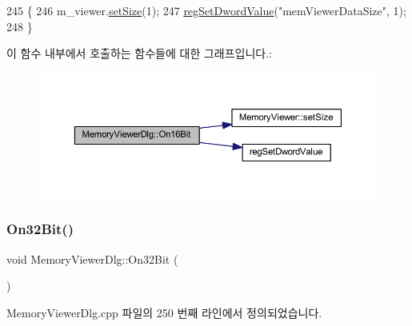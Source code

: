 \begin{DoxyCode}
245 \{
246   m\_viewer.\mbox{\hyperlink{class_memory_viewer_a185cb06e604ff1e0016b9be859c21387}{setSize}}(1);
247   \mbox{\hyperlink{_reg_8cpp_a758e775489a3fb5c3cc7071fdd5af87e}{regSetDwordValue}}(\textcolor{stringliteral}{"memViewerDataSize"}, 1);
248 \}
\end{DoxyCode}
이 함수 내부에서 호출하는 함수들에 대한 그래프입니다.\+:
\nopagebreak
\begin{figure}[H]
\begin{center}
\leavevmode
\includegraphics[width=350pt]{class_memory_viewer_dlg_a61f6aec84a4bcf908dc32f9e85c871d0_cgraph}
\end{center}
\end{figure}
\mbox{\label{class_memory_viewer_dlg_afb8178dcad55d86c9217f89e0ed4814f}} 
\subsubsection{\texorpdfstring{On32\+Bit()}{On32Bit()}}
{\footnotesize\ttfamily void Memory\+Viewer\+Dlg\+::\+On32\+Bit (\begin{DoxyParamCaption}{ }\end{DoxyParamCaption})\hspace{0.3cm}{\ttfamily [protected]}}



Memory\+Viewer\+Dlg.\+cpp 파일의 250 번째 라인에서 정의되었습니다.


